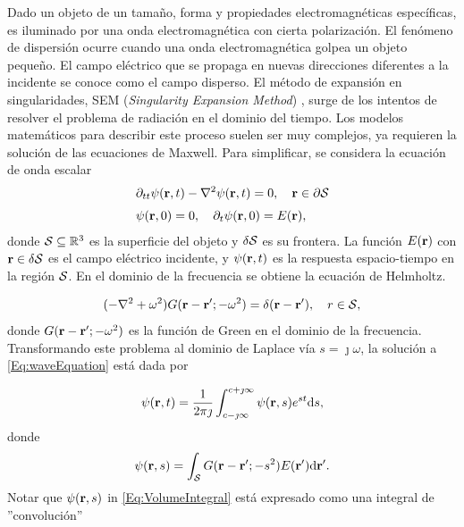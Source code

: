 Dado un objeto de un tamaño, forma y propiedades electromagnéticas específicas, es iluminado por una onda electromagnética con cierta polarización. El fenómeno de dispersión  ocurre cuando una onda electromagnética golpea un objeto pequeño. El campo eléctrico que se propaga en nuevas direcciones diferentes a la incidente se conoce como el campo disperso. El método de expansión en singularidades, SEM (\emph{Singularity Expansion Method}) \cite{Baum1971}, surge de los intentos de resolver el problema de radiación en el dominio del tiempo. Los modelos matemáticos para describir este proceso suelen ser muy complejos, ya requieren la solución de las ecuaciones de Maxwell. Para simplificar, se considera la ecuación de onda escalar
\begin{equation}
	\begin{aligned} 
		& \partial_{tt}\psi(\mathbf{r},t) - \nabla^2\psi(\mathbf{r},t) = 0, \quad \mathbf{r}\in\partial \mathcal{S}\\[0.3em]
		& \psi(\mathbf{r},0) = 0,\quad \partial_t\psi(\mathbf{r},0) = E(\mathbf{r}),\\
	\end{aligned}
	\label{Eq:waveEquation}
\end{equation}
donde $\mathcal{S}\subseteq\mathbb{R}^3$ es la superficie del objeto y $\delta \mathcal{S}$ es su frontera. La función $E(\mathbf{r})$ con $\mathbf{r}\in\delta \mathcal{S}$ es el campo eléctrico incidente, y $\psi(\mathbf{r},t)$ es la respuesta espacio-tiempo en la región $\mathcal{S}$. En el dominio de la frecuencia se obtiene la ecuación de Helmholtz.	

\begin{equation}
	(-\nabla^2 + \omega^2)G(\mathbf{r}-\mathbf{r}';-\omega^2) = \delta(\mathbf{r}-\mathbf{r}'), \quad r\in \mathcal{S},
	\label{Eq:HelmholtzEquation}
\end{equation}
donde $G(\mathbf{r}-\mathbf{r}';-\omega^2)$ es la función de Green en el dominio de la frecuencia. Transformando este problema al dominio de Laplace vía $s=\jmath\omega$, la solución a \eqref{Eq:waveEquation} está dada por

\begin{equation}
	\psi(\mathbf{r},t) = \frac{1}{2\pi\jmath}\int_{c-\jmath\infty}^{c+\jmath\infty}\psi(\mathbf{r},s)e^{st}\mathrm{d}s,
	\label{Eq:LaplaceDomain}
\end{equation}
donde 
\begin{equation}
	\psi(\mathbf{r},s) = \int_{\mathcal{S}} G(\mathbf{r}-\mathbf{r}';-s^2)E(\mathbf{r}')\mathrm{d}\mathbf{r}'.
	\label{Eq:VolumeIntegral}
\end{equation}
Notar que $\psi(\mathbf{r},s)$ in \eqref{Eq:VolumeIntegral} está expresado como una integral de ''convolución'' %

